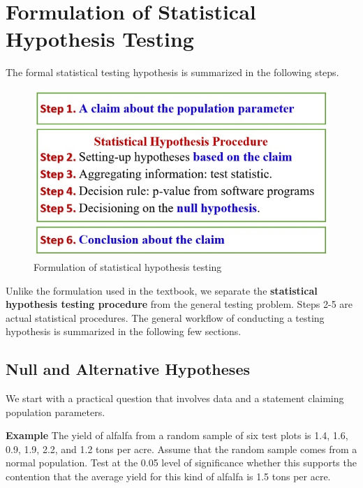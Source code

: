 \documentclass[
]{book}
\begin{document}
\hypertarget{formulation-of-statistical-hypothesis-testing}{%
\section{Formulation of Statistical Hypothesis Testing}\label{formulation-of-statistical-hypothesis-testing}}

The formal statistical testing hypothesis is summarized in the following steps.

\begin{figure}

{\centering \includegraphics[width=0.8\linewidth]{img07/w07-Steps4HypothesisTest} 

}

\caption{Formulation of statistical hypothesis testing}\label{fig:unnamed-chunk-108}
\end{figure}

Unlike the formulation used in the textbook, we separate the \textbf{statistical hypothesis testing procedure} from the general testing problem. Steps 2-5 are actual statistical procedures. The general workflow of conducting a testing hypothesis is summarized in the following few sections.

\hypertarget{null-and-alternative-hypotheses}{%
\subsection{Null and Alternative Hypotheses}\label{null-and-alternative-hypotheses}}

We start with a practical question that involves data and a statement claiming population parameters.

\textbf{Example} The yield of alfalfa from a random sample of six test plots is 1.4, 1.6, 0.9, 1.9, 2.2, and 1.2 tons per acre. Assume that the random sample comes from a normal population. Test at the 0.05 level of significance whether this supports the contention that the average yield for this kind of alfalfa is 1.5 tons per acre.
\end{document}
